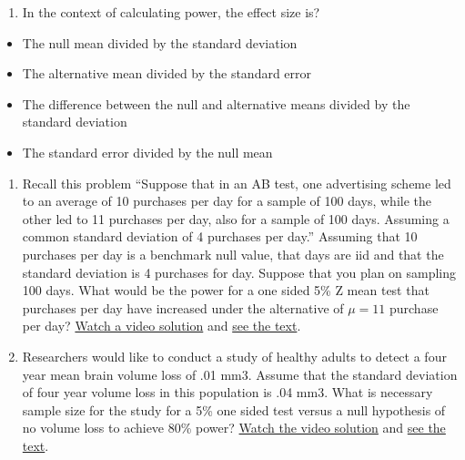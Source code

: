 \documentclass[]{article}
\begin{document}
\begin{enumerate}
\def\labelenumi{\arabic{enumi}.}
\setcounter{enumi}{3}
\itemsep1pt\parskip0pt
\item
  In the context of calculating power, the effect size is?
\end{enumerate}

\begin{itemize}
\itemsep1pt\parskip0pt
\item
  The null mean divided by the standard deviation
\item
  The alternative mean divided by the standard error
\item
  The difference between the null and alternative means divided by the
  standard deviation
\item
  The standard error divided by the null mean
\end{itemize}

\begin{enumerate}
\def\labelenumi{\arabic{enumi}.}
\setcounter{enumi}{4}
\itemsep1pt\parskip0pt
\item
  Recall this problem ``Suppose that in an AB test, one advertising
  scheme led to an average of 10 purchases per day for a sample of 100
  days, while the other led to 11 purchases per day, also for a sample
  of 100 days. Assuming a common standard deviation of 4 purchases per
  day.'' Assuming that 10 purchases per day is a benchmark null value,
  that days are iid and that the standard deviation is 4 purchases for
  day. Suppose that you plan on sampling 100 days. What would be the
  power for a one sided 5\% Z mean test that purchases per day have
  increased under the alternative of $\mu = 11$ purchase per day?
  \href{https://www.youtube.com/watch?v=RiS6EFnPYY8\&index=34\&list=PLpl-gQkQivXhHOcVeU3bSJg78zaDYbP9L}{Watch
  a video solution} and
  \href{http://bcaffo.github.io/courses/06_StatisticalInference/homework/hw4.html\#10}{see
  the text}.
\item
  Researchers would like to conduct a study of healthy adults to detect
  a four year mean brain volume loss of .01 mm3. Assume that the
  standard deviation of four year volume loss in this population is .04
  mm3. What is necessary sample size for the study for a 5\% one sided
  test versus a null hypothesis of no volume loss to achieve 80\% power?
  \href{https://www.youtube.com/watch?v=lrXyJrtatzk\&index=35\&list=PLpl-gQkQivXhHOcVeU3bSJg78zaDYbP9L}{Watch
  the video solution} and
  \href{http://bcaffo.github.io/courses/06_StatisticalInference/homework/hw4.html\#11}{see
  the text}.
\end{enumerate}
\end{document}
